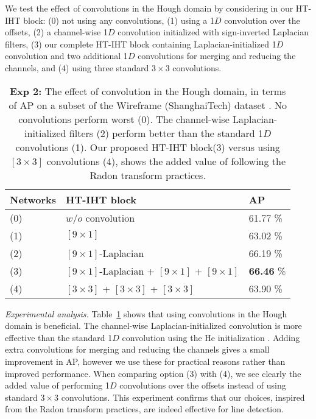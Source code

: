 \documentclass[runningheads]{llncs}
\newcommand{\model}{HT-IHT block\xspace}
\begin{document}
We test the effect of convolutions in the Hough domain by considering in our \model:
(0) not using any convolutions, 
(1) using a 1$D$ convolution over the offsets,
(2) a channel-wise 1$D$ convolution initialized with sign-inverted Laplacian filters,
(3) our complete \model containing Laplacian-initialized 1$D$ convolution and two additional 1$D$ convolutions for merging and reducing the channels, and
(4) using three standard $3\times3$ convolutions.\\

\begin{table}[t!]
    \centering
    \begin{tabular}{l@{\hskip 0.2in}l@{\hskip 0.4in}l}
             \toprule
           Networks & \model     & AP \\ \midrule
           (0) & $w/o$ convolution                                    & 61.77 \% \\
           (1) & $[9\times1]$                                         & 63.02 \% \\
           (2) & $[9\times1]$-Laplacian                               & 66.19 \% \\
           (3) & $[9\times1]$-Laplacian + $[9\times1]$ + $[9\times1]$ & \textbf{66.46} \% \\
           (4) &$[3\times3]$ + $[3\times3]$ + $[3\times3]$            & 63.90 \%  \\
           \bottomrule
        \end{tabular} 
    \caption{\textbf{Exp 2:} The effect of convolution in the Hough domain, in terms of AP on a subset of the Wireframe (ShanghaiTech) dataset \cite{huang2018learning}.
    No convolutions perform worst (0). 
    The channel-wise Laplacian-initialized filters (2) perform better than the standard 1$D$ convolutions (1). 
    Our proposed \model (3) versus using $[3\times3]$ convolutions (4), shows the added value of following the Radon transform practices.}
    \label{tab:exp2}
\end{table}

\noindent\emph{Experimental analysis.} 
Table~\ref{tab:exp2} shows that using convolutions in the Hough domain is beneficial. 
The channel-wise Laplacian-initialized convolution is more effective than the standard 1$D$ convolution using the He initialization \cite{he2015delving}. 
Adding extra convolutions for merging and reducing the channels gives a small improvement in AP, however we use these for practical reasons rather than improved performance. 
When comparing option (3) with (4), we see clearly the added value of performing 1$D$ convolutions over the offsets instead of using standard $3\times 3$ convolutions. 
This experiment confirms that our choices, inspired from the Radon transform practices, are indeed effective for line detection.
\end{document}

